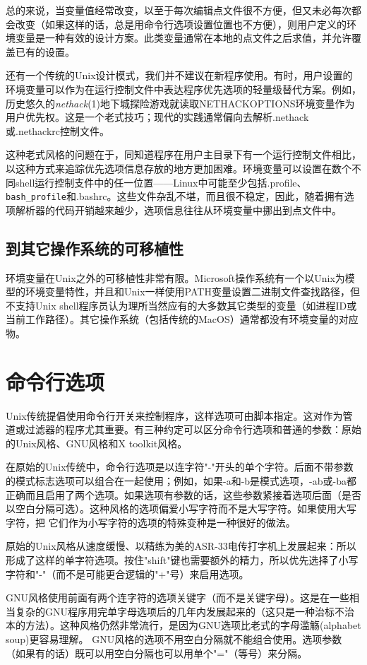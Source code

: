 \documentclass[12pt,oneside]{ctexbook}
\begin{document}
\begin{common-format}
总的来说，当变量值经常改变，以至于每次编辑点文件很不方便，但又未必每次都会改变（如果这样的话，总是用命令行选项设置位置也不方便），则用户定义的环境变量是一种有效的设计方案。此类变量通常在本地的点文件之后求值，并允许覆盖已有的设置。

还有一个传统的Unix设计模式，我们并不建议在新程序使用。有时，用户设置的环境变量可以作为在运行控制文件中表达程序优先选项的轻量级替代方案。例如，历史悠久的\textit{nethack}(1)地下城探险游戏就读取NETHACKOPTIONS环境变量作为用户优先权。这是一个老式技巧；现代的实践通常偏向去解析.nethack或.nethackrc控制文件。

这种老式风格的问题在于，同知道程序在用户主目录下有一个运行控制文件相比，以这种方式来追踪优先选项信息存放的地方更加困难。环境变量可以设置在数个不同shell运行控制支件中的任一位置——Linux中可能至少包括.profile、\verb+bash_profile+和.bashrc。这些文件杂乱不堪，而且很不稳定，因此，随着拥有选项解析器的代码开销越来越少，选项信息往往从环境变量中挪出到点文件中。

\subsection{到其它操作系统的可移植性}
环境变量在Unix之外的可移植性非常有限。Microsoft操作系统有一个以Unix为模型的环境变量特性，并且和Unix一样使用PATH变量设置二进制文件查找路径，但不支持Unix shell程序员认为理所当然应有的大多数其它类型的变量（如进程ID或当前工作路径）。其它操作系统（包括传统的MacOS）通常都没有环境变量的对应物。

\section{命令行选项}
Unix传统提倡使用命令行开关来控制程序，这样选项可由脚本指定。这对作为管道或过滤器的程序尤其重要。有三种约定可以区分命令行选项和普通的参数：原始的Unix风格、GNU风格和X toolkit风格。

在原始的Unix传统中，命令行选项是以连字符"-"开头的单个字符。后面不带参数的模式标志选项可以组合在一起使用；例如，如果-a和-b是模式选项，-ab或-ba都正确而且启用了两个选项。如果选项有参数的话，这些参数紧接着选项后面（是否以空白分隔可选）。这种风格的选项偏爱小写字符而不是大写字符。如果使用大写字符，把
它们作为小写字符的选项的特殊变种是一种很好的做法。

原始的Unix风格从速度缓慢、以精练为美的ASR-33电传打字机上发展起来：所以形成了这样的单字符选项。按住"shift"键也需要额外的精力，所以优先选择了小写字符和"-"（而不是可能更合逻辑的"+"号）来启用选项。

GNU风格使用前面有两个连字符的选项关键字（而不是关键字母）。这是在一些相当复杂的GNU程序用完单字母选项后的几年内发展起来的（这只是一种治标不治本的方法）。这种风格仍然非常流行，是因为GNU选项比老式的字母滥觞(alphabet soup)更容易理解。 GNU风格的选项不用空白分隔就不能组合使用。选项参数（如果有的话）既可以用空白分隔也可以用单个"="（等号）来分隔。


\end{common-format}
\end{document}
